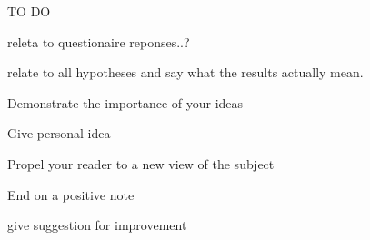 \documentclass[11pt,english]{article}
\begin{document}
TO DO

releta to questionaire reponses..?

relate to all hypotheses and say what the results actually mean.



Demonstrate the importance of your ideas


Give personal idea



Propel your reader to a new view of the subject



End on a positive note


give suggestion for improvement






























 





\end{document}
